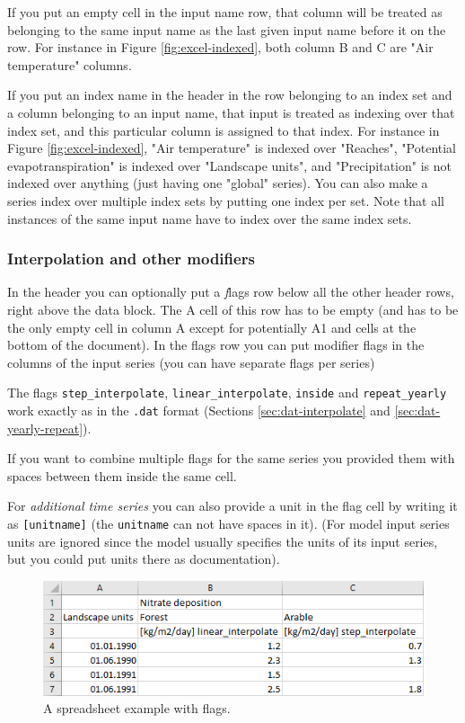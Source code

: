 \documentclass[11pt]{article}
\theoremstyle{definition}
\begin{document}
If you put an empty cell in the input name row, that column will be treated as belonging to the same input name as the last given input name before it on the row. For instance in Figure \ref{fig:excel-indexed}, both column B and C are "Air temperature" columns.

If you put an index name in the header in the row belonging to an index set and a column belonging to an input name, that input is treated as indexing over that index set, and this particular column is assigned to that index. For instance in Figure \ref{fig:excel-indexed}, "Air temperature" is indexed over "Reaches", "Potential evapotranspiration" is indexed over "Landscape units", and "Precipitation" is not indexed over anything (just having one "global" series). You can also make a series index over multiple index sets by putting one index per set. Note that all instances of the same input name have to index over the same index sets.

\subsubsection{Interpolation and other modifiers}

In the header you can optionally put a {\emph flags} row below all the other header rows, right above the data block. The A cell of this row has to be empty (and has to be the only empty cell in column A except for potentially A1 and cells at the bottom of the document). In the flags row you can put modifier flags in the columns of the input series (you can have separate flags per series)

The flags {\tt step\_interpolate}, {\tt linear\_interpolate}, {\tt inside} and {\tt repeat\_yearly} work exactly as in the {\tt .dat} format (Sections \ref{sec:dat-interpolate} and \ref{sec:dat-yearly-repeat}).

If you want to combine multiple flags for the same series you provided them with spaces between them inside the same cell.

For \emph{additional time series} you can also provide a unit in the flag cell by writing it as {\tt [unitname]} (the {\tt unitname} can not have spaces in it). (For model input series units are ignored since the model usually specifies the units of its input series, but you could put units there as documentation).

\begin{figure}[h]\label{fig:excel-flags}
\centering
\includegraphics[width=0.6\linewidth]{img/excel_flags}
\caption{A spreadsheet example with flags.}
\end{figure}
\end{document}
